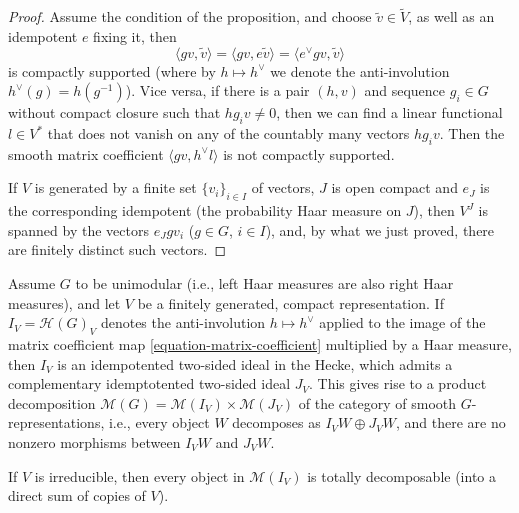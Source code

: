 \begin{proof}
	Assume the condition of the proposition, and choose $\tilde v\in\tilde V$, as well as an idempotent $e$ fixing it, then 
	\[\langle gv, \tilde v\rangle = \langle gv, e\tilde v\rangle = \langle e^\vee g v,\tilde v \rangle\]
	 is compactly supported (where by $h\mapsto h^\vee$ we denote the anti-involution $h^\vee(g)=h(g^{-1})$). Vice versa, if there is a pair $(h,v)$ and sequence $g_i \in G$ without compact closure such that $hg_i v\ne 0$, then we can find a linear functional $l\in V^*$ that does not vanish on any of the countably many vectors $hg_i v$. Then the smooth matrix coefficient $\langle g v,  h^\vee l\rangle$ is not compactly supported.
	 
	 If $V$ is generated by a finite set $\{v_i\}_{i\in I}$ of vectors, $J$ is open compact and $e_J$ is the corresponding idempotent (the probability Haar measure on $J$), then $V^J$ is spanned by the vectors $e_J g v_i$ ($g\in G$, $i\in I$), and, by what we just proved, there are finitely distinct such vectors.
\end{proof}


\begin{theorem}
	\label{theorem-compact-splits}
  Assume $G$ to be unimodular (i.e., left Haar measures are also right Haar measures), and let $V$ be a finitely generated, compact representation. If $I_V=\mathcal H(G)_V$ denotes the anti-involution $h\mapsto h^\vee$ applied to the image of the matrix coefficient map \eqref{equation-matrix-coefficient} multiplied by a Haar measure, then $I_V$ is an idempotented two-sided ideal in the Hecke, which admits a complementary idemptotented two-sided ideal $J_V$. This gives rise to a product decomposition $\mathcal M(G)=\mathcal M(I_V)\times \mathcal M(J_V)$ of the category of smooth $G$-representations, i.e., every object $W$ decomposes as $I_VW \oplus J_V W$, and there are no nonzero morphisms between $I_VW$ and $J_V W$.
  
  If $V$ is irreducible, then every object in $\mathcal M(I_V)$ is totally decomposable (into a direct sum of copies of $V$).
\end{theorem}

